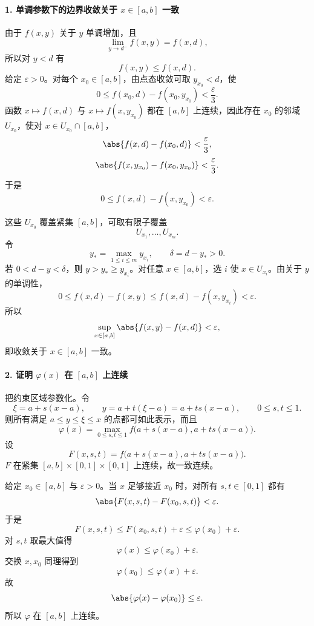 \paragraph{1. 单调参数下的边界收敛关于 $x\in[a,b]$ 一致}
\begin{xsolution}
由于 $f(x,y)$ 关于 $y$ 单调增加，且
\[
  \lim_{y\to d^-}f(x,y)=f(x,d),
\]
所以对 $y<d$ 有
\[
  f(x,y)\le f(x,d).
\]
给定 $\varepsilon>0$。对每个 $x_0\in[a,b]$，由点态收敛可取 $y_{x_0}<d$，使
\[
  0\le f(x_0,d)-f(x_0,y_{x_0})<\frac\varepsilon3.
\]
函数 $x\mapsto f(x,d)$ 与 $x\mapsto f(x,y_{x_0})$ 都在 $[a,b]$ 上连续，因此存在 $x_0$ 的邻域 $U_{x_0}$，使对 $x\in U_{x_0}\cap[a,b]$，
\[
  \abs{f(x,d)-f(x_0,d)}<\frac\varepsilon3,
\]
\[
  \abs{f(x,y_{x_0})-f(x_0,y_{x_0})}<\frac\varepsilon3.
\]
于是
\[
  0\le f(x,d)-f(x,y_{x_0})<\varepsilon.
\]

这些 $U_{x_0}$ 覆盖紧集 $[a,b]$，可取有限子覆盖
\[
  U_{x_1},\ldots,U_{x_m}.
\]
令
\[
  y_*=\max_{1\le i\le m}y_{x_i},
  \qquad
  \delta=d-y_*>0.
\]
若 $0<d-y<\delta$，则 $y>y_*\ge y_{x_i}$。对任意 $x\in[a,b]$，选 $i$ 使 $x\in U_{x_i}$。由关于 $y$ 的单调性，
\[
  0\le f(x,d)-f(x,y)
  \le f(x,d)-f(x,y_{x_i})<\varepsilon.
\]
所以
\[
  \sup_{x\in[a,b]}\abs{f(x,y)-f(x,d)}<\varepsilon,
\]
即收敛关于 $x\in[a,b]$ 一致。
\end{xsolution}

\paragraph{2. 证明 $\varphi(x)$ 在 $[a,b]$ 上连续}
\begin{xsolution}
把约束区域参数化。令
\[
  \xi=a+s(x-a),
  \qquad
  y=a+t(\xi-a)=a+ts(x-a),
  \qquad 0\le s,t\le1.
\]
则所有满足 $a\le y\le\xi\le x$ 的点都可如此表示，而且
\[
  \varphi(x)
  =\max_{0\le s,t\le1}
  f\bigl(a+s(x-a),a+ts(x-a)\bigr).
\]
设
\[
  F(x,s,t)=f\bigl(a+s(x-a),a+ts(x-a)\bigr).
\]
$F$ 在紧集 $[a,b]\times[0,1]\times[0,1]$ 上连续，故一致连续。

给定 $x_0\in[a,b]$ 与 $\varepsilon>0$。当 $x$ 足够接近 $x_0$ 时，对所有 $s,t\in[0,1]$ 都有
\[
  \abs{F(x,s,t)-F(x_0,s,t)}<\varepsilon.
\]
于是
\[
  F(x,s,t)\le F(x_0,s,t)+\varepsilon
  \le\varphi(x_0)+\varepsilon.
\]
对 $s,t$ 取最大值得
\[
  \varphi(x)\le\varphi(x_0)+\varepsilon.
\]
交换 $x,x_0$ 同理得到
\[
  \varphi(x_0)\le\varphi(x)+\varepsilon.
\]
故
\[
  \abs{\varphi(x)-\varphi(x_0)}\le\varepsilon.
\]
所以 $\varphi$ 在 $[a,b]$ 上连续。
\end{xsolution}

